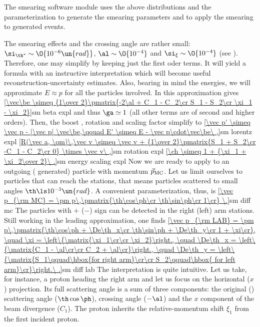 The smearing software module uses the above distributions and the parameterization  to generate the smearing parameters and  to apply the smearing to  generated events.

The smearing effects and the crossing angle are rather small: $\si_{\th^*} \sim \O{10^{-6}\un{rad}}$, $\al \sim \O{10^{-4}}$ and $\si_\xi \sim \O{10^{-4}}$ (see ). Therefore, one may simplify  by keeping just the first oder terms. It will yield a formula with an instructive interpretation which will become useful reconstruction-uncertainty estimates. Also, bearing in mind the  energies, we will approximate $E\approx p$ for all the particles involved. In this approximation  gives
\eqref{\vec\be \simeq {1\over 2}\pmatrix{-2\al + C_1 - C_2\cr S_1 - S_2\cr \xi_1 - \xi_2}}{sm beta expl}
and thus $\ga\simeq 1$ (all other terms are of second and higher orders). Then, the boost , rotation  and scaling factor  simplify to
\eqref{\vec p' \simeq \vec p - |\vec p| \vec\be,\qquad E' \simeq E - \vec p\cdot\vec\be\ ,}{sm lorentz expl}
\eqref{R(\vec a, \om)\,\vec v \simeq \vec v + {1\over 2}\pmatrix{S_1 + S_2\cr -C_1 - C_2\cr 0} \times \vec v\ ,}{sm rotation expl}
\eqref{\ch \simeq 1 + {\xi_1 + \xi_2\over 2}\ .}{sm energy scaling expl}
Now we are ready to apply  to an outgoing ( generated) particle with momentum $\vec p_{\rm MC}$. Let us limit ourselves to particles that can reach the  stations, that means particles scattered to small angles $\th \ls 10^{-3}\un{rad}$. A convenient parameterization, thus, is
\eqref{\vec p_{\rm MC} = \pm p\,\pmatrix{\th\cos\ph\cr \th\sin\ph\cr 1\cr} \.}{sm diff mc}
The particles with $+$ ($-$) sign can be detected in the right (left) arm  stations. Still working in the leading approximation, one finds
\eqref{\vec p_{\rm LAB} = \pm p\,\pmatrix{\th\cos\ph + \De\th_x\cr \th\sin\ph + \De\th_y\cr 1 + \xi\cr},
\quad \xi = \left\{\matrix{\xi_1\cr\cr \xi_2}\right.,
\quad \De\th_x = \left\{\matrix{C_1 - \al\cr\cr C_2 + \al\cr}\right.,
\quad \De\th_y = \left\{\matrix{S_1\qquad\hbox{for right arm}\cr\cr S_2\qquad\hbox{ for left arm}\cr}\right.\ .}{sm diff lab} %
The interpretation is quite intuitive. Let us take, for instance, a proton heading the right arm and let us focus on the horizontal ($x$) projection. Its full scattering angle is a sum of three components: the original () scattering angle ($\th\cos\ph$), crossing angle ($-\al$) and the $x$ component of the beam divergence ($C_1$). The proton inherits the relative-momentum shift $\xi_1$ from the first incident proton.


